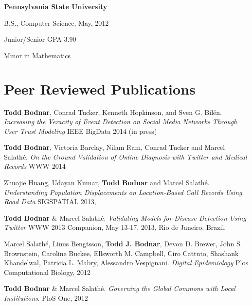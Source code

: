 \documentclass[margin,line]{res}
\newcommand{\linkToUrl}[1]{{\color{blue}\underline{\href{#1}{Link}}}}
\renewcommand{\linkToUrl}[1]{}
\newenvironment{list1}{
  \begin{list}{\ding{113}}{%
      \setlength{\itemsep}{0in}
      \setlength{\parsep}{0in} \setlength{\parskip}{0in}
      \setlength{\topsep}{0in} \setlength{\partopsep}{0in} 
      \setlength{\leftmargin}{0.17in}}}{\end{list}}
\begin{document}
\begin{resume}
{\bf Pennsylvania State University} \\
\vspace*{-.1in}
\begin{list1}
\item[] B.S., Computer Science,  May, 2012 
\item[] Junior/Senior GPA 3.90
\item[] Minor in Mathematics
\end{list1}

\section{\sc Peer Reviewed Publications}

\begin{etaremune}[start=6,leftmargin=13pt]

\item \textbf{Todd Bodnar}, Conrad Tucker, Kenneth Hopkinson, and Sven G. Bil\'en. \textit{Increasing the Veracity of Event Detection on Social Media Networks Through User Trust Modeling} IEEE BigData 2014 (in press)

\item \textbf{Todd Bodnar}, Victoria Barclay, Nilam Ram, Conrad Tucker and Marcel Salath\'e. \textit{On the Ground Validation of Online Diagnosis with Twitter and Medical Records} WWW 2014 \linkToUrl{http://bit.ly/R82tZp}

\item Zhuojie Huang, Udayan Kumar, \textbf{Todd Bodnar} and Marcel Salath\'e. \textit{Understanding Population Displacements on Location-Based Call Records Using Road Data} SIGSPATIAL 2013, \linkToUrl{http://bit.ly/1dAjC5o}

\item \textbf{Todd Bodnar} \& Marcel Salath\'e. \textit{Validating Models for Disease Detection Using Twitter}  WWW 2013 Companion, May 13-17, 2013, Rio de Janeiro, Brazil. \linkToUrl{http://bit.ly/WWL1Gr}

\item Marcel Salath\'e, Linus Bengtsson, \textbf{Todd J. Bodnar}, Devon D. Brewer, John S. Brownstein, Caroline Buckee, Ellsworth M. Campbell, Ciro Cattuto, Shashank Khandelwal, Patricia L. Mabry,  Alessandro Vespignani. \textit{Digital Epidemiology} Plos Computational Biology, 2012 \linkToUrl{http://bitly.com/PO2fSx}

\item \textbf{Todd Bodnar} \& Marcel Salath\'e. \textit{Governing the Global Commons with Local Institutions}. PloS One, 2012 \linkToUrl{http://bit.ly/TtsZd5}
\end{etaremune}


\end{resume}
\end{document}
